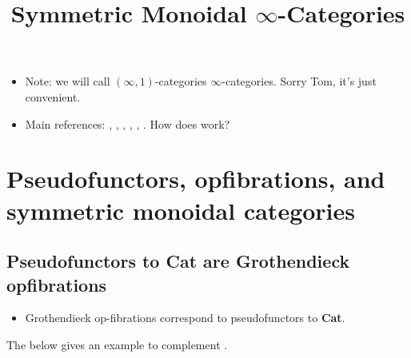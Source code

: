 \documentclass{MetricNotes2023}
\title{Symmetric Monoidal \(\infty\)-Categories}
\date{\vspace{-5ex}}
\begin{document}
\maketitle
%

\DeclarePairedDelimiter{\norm}{\lVert}{\rVert} 
\DeclarePairedDelimiter{\abs}{\lvert}{\rvert} 
\DeclarePairedDelimiter{\ang}{\langle}{\rangle} 

\begin{itemize}
\item Note: we will call \((\infty, 1)\)-categories \(\infty\)-categories. Sorry Tom, it's just convenient. 
\item Main references: \autocite{higheralgebra}, \autocite{lurie2008higher}, \autocite{symmetricmonoidal}, \autocite{goodfibrations}, \autocite{groth2015short}, \autocite{kerodon}. How does \cite[\href{https://kerodon.net/tag/01UB}{Example 01UB}]{kerodon} work?
\end{itemize}

\section{Pseudofunctors, opfibrations, and symmetric monoidal categories}

\subsection{Pseudofunctors to \textbf{Cat} are Grothendieck opfibrations}

\begin{itemize}
\item Grothendieck op-fibrations correspond to pseudofunctors to \textbf{Cat}.
\end{itemize}

The below gives an example to complement \autocite{symmetricmonoidal}.
\end{document}
